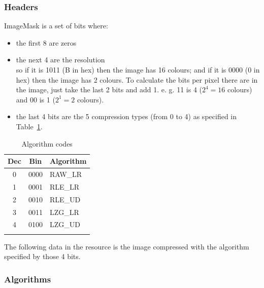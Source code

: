 \documentclass{article}
\begin{document}
\subsubsection{Headers} %



 ImageMask is a set of bits where:
\begin{itemize}
\item  the first 8 are zeros
\item  the next 4 are the resolution\\
   so if it is 1011 (B in hex) then the image has 16 colours;
   and if it is 0000 (0 in hex) then the image has 2 colours.
   To calculate the bits per pixel there are in the image, just take the
   last 2 bits and add 1. e. g. 11 is 4 ($2^4=16$ colours) and 00 is 1 ($2^1=2$ colours).
\item  the last 4 bits are the 5 compression types (from 0 to 4) as specified in Table~\ref{algorithm codes}.
\end{itemize}

\renewcommand{\tabcolsep}{1em}
\begin{longtable}{ccl}
 \hline
  Dec & Bin & Algorithm \\
 \hline
  0 & 0000 & RAW\_LR \\
  1 & 0001 & RLE\_LR \\
  2 & 0010 & RLE\_UD \\
  3 & 0011 & LZG\_LR \\
  4 & 0100 & LZG\_UD \\
 \hline
 \caption{Algorithm codes}
 \label{algorithm codes}
\end{longtable}

 The following data in the resource is the image compressed with the
 algorithm specified by those 4 bits.

\subsubsection{Algorithms} %
\end{document}
